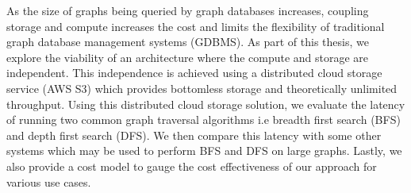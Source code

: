 As the size of graphs being queried by graph databases increases, coupling 
storage and compute increases the cost and limits the flexibility of
traditional graph database management systems (GDBMS). As part of this thesis,
we explore the viability of an architecture where the compute and storage are
independent. This independence is achieved using a distributed cloud storage
service (AWS S3) which provides bottomless storage and theoretically unlimited
throughput. Using this distributed cloud storage solution, we evaluate the
latency of running two common graph traversal algorithms i.e breadth first
search (BFS) and depth first search (DFS). We then compare this latency with
some other systems which may be used to perform BFS and DFS on large graphs.
Lastly, we also provide a cost model to gauge the cost effectiveness of our
approach for various use cases.
